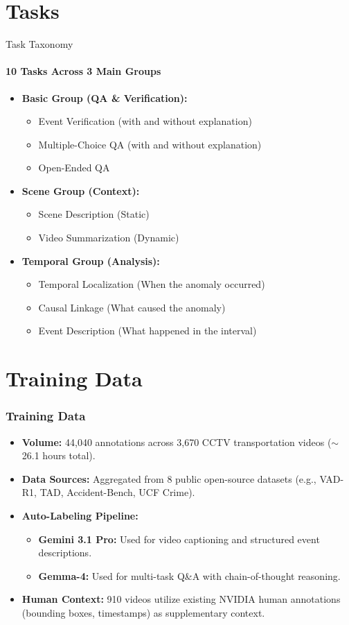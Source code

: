 \documentclass[aspectratio=169]{beamer}
\begin{document}
\section{Tasks}
\begin{frame}{Task Taxonomy}
    \framesubtitle{10 Tasks Across 3 Main Groups}
    \begin{itemize}
        \item \textbf{Basic Group (QA \& Verification):}
        \begin{itemize}
            \item Event Verification (with and without explanation)
            \item Multiple-Choice QA (with and without explanation)
            \item Open-Ended QA
        \end{itemize}
        \item \textbf{Scene Group (Context):}
        \begin{itemize}
            \item Scene Description (Static)
            \item Video Summarization (Dynamic)
        \end{itemize}
        \item \textbf{Temporal Group (Analysis):}
        \begin{itemize}
            \item Temporal Localization (When the anomaly occurred)
            \item Causal Linkage (What caused the anomaly)
            \item Event Description (What happened in the interval)
        \end{itemize}
    \end{itemize}
\end{frame}
\section{Training Data}
\begin{frame}
\frametitle{Training Data}
\begin{itemize}
        \item \textbf{Volume:} 44,040 annotations across 3,670 CCTV transportation videos ($\sim$26.1 hours total).
        \item \textbf{Data Sources:} Aggregated from 8 public open-source datasets (e.g., VAD-R1, TAD, Accident-Bench, UCF Crime).
        \item \textbf{Auto-Labeling Pipeline:} 
        \begin{itemize}
            \item \textbf{Gemini 3.1 Pro:} Used for video captioning and structured event descriptions.
            \item \textbf{Gemma-4:} Used for multi-task Q\&A with chain-of-thought reasoning.
        \end{itemize}
        \item \textbf{Human Context:} 910 videos utilize existing NVIDIA human annotations (bounding boxes, timestamps) as supplementary context.
    \end{itemize}
\end{frame}
\end{document}
